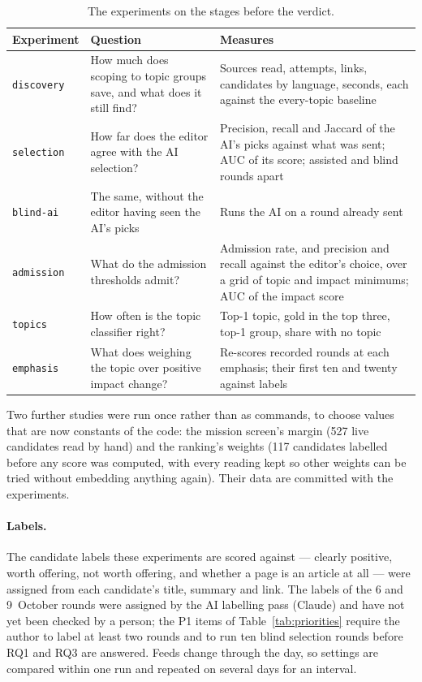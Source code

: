 \begin{table}[ht]
\centering
\small
\caption{The experiments on the stages before the verdict.}
\label{tab:experiments}
\begin{tabularx}{\linewidth}{@{}lXX@{}}
\toprule
\textbf{Experiment} & \textbf{Question} & \textbf{Measures} \\
\midrule
\texttt{discovery} & How much does scoping to topic groups save, and
what does it still find? & Sources read, attempts, links, candidates by
language, seconds, each against the every-topic baseline \\
\texttt{selection} & How far does the editor agree with the AI
selection? & Precision, recall and Jaccard of the AI's picks against
what was sent; AUC of its score; assisted and blind rounds apart \\
\texttt{blind-ai} & The same, without the editor having seen the AI's
picks & Runs the AI on a round already sent \\
\texttt{admission} & What do the admission thresholds admit? &
Admission rate, and precision and recall against the editor's choice,
over a grid of topic and impact minimums; AUC of the impact score \\
\texttt{topics} & How often is the topic classifier right? & Top-1
topic, gold in the top three, top-1 group, share with no topic \\
\texttt{emphasis} & What does weighing the topic over positive impact
change? & Re-scores recorded rounds at each emphasis; their first ten
and twenty against labels \\
\bottomrule
\end{tabularx}
\end{table}

Two further studies were run once rather than as commands, to choose
values that are now constants of the code: the mission screen's margin
(527 live candidates read by hand) and the ranking's weights (117
candidates labelled before any score was computed, with every reading
kept so other weights can be tried without embedding anything again).
Their data are committed with the experiments.

\paragraph{Labels.} The candidate labels these experiments are scored
against --- clearly positive, worth offering, not worth offering, and
whether a page is an article at all --- were assigned from each
candidate's title, summary and link. The labels of the 6 and
9~October rounds were assigned by the AI labelling pass (Claude) and
have not yet been checked by a person; the P1 items of
Table~\ref{tab:priorities} require the author to label at least two
rounds and to run ten blind selection rounds before RQ1 and RQ3 are
answered. Feeds change through the day, so settings are compared
within one run and repeated on several days for an interval.
